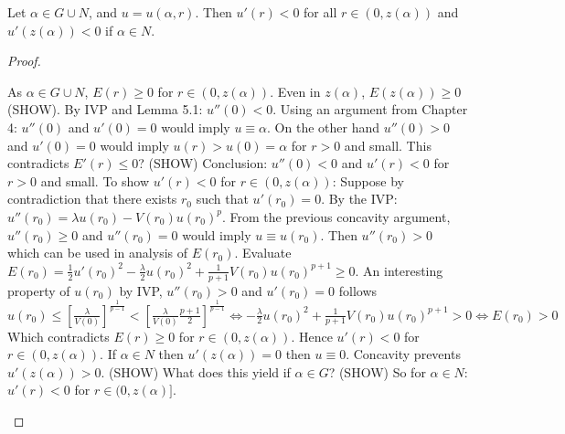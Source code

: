 \newpage
\begin{lemma}
  Let $\alpha\in G\cup N$, and $u=u(\alpha,r)$.
  Then $u'(r)<0$ for all $r\in(0,z(\alpha))$ and $u'(z(\alpha))<0$ if $\alpha\in N$.
%

%
\begin{proof}
  \begin{outline}
    \1 As $\alpha\in G\cup N$, $E(r)\geq0$ for $r\in(0,z(\alpha))$.
    \1 Even in $z(\alpha)$, $E(z(\alpha))\geq0$ (SHOW).
    \1 By IVP and Lemma 5.1: $u''(0)<0$.
    \1 Using an argument from Chapter 4: $u''(0)$ and $u'(0)=0$ would imply $u\equiv\alpha$.
    \1 On the other hand $u''(0)>0$ and $u'(0)=0$ would imply $u(r)>u(0)=\alpha$ for $r>0$ and small.
    \1 This contradicts $E'(r)\leq0$? (SHOW)
    \1 Conclusion: $u''(0)<0$ and $u'(r)<0$ for $r>0$ and small.
    \1 To show $u'(r)<0$ for $r\in(0,z(\alpha))$:
      \2 Suppose by contradiction that there exists $r_0$ such that $u'(r_0)=0$.
      \2 By the IVP: $u''(r_0)=\lambda u(r_0)-V(r_0)u(r_0)^p$.
      \2 From the previous concavity argument, $u''(r_0)\geq0$ and $u''(r_0)=0$ would imply $u\equiv u(r_0)$.
      \2 Then $u''(r_0)>0$ which can be used in analysis of $E(r_0)$.
      \2 Evaluate $E(r_0)=\frac{1}{2}u'(r_0)^2-\frac{\lambda}{2}u(r_0)^2 + \frac{1}{p+1}V(r_0)u(r_0)^{p+1}\geq 0$.
      \2 An interesting property of $u(r_0)$ by IVP, $u''(r_0)>0$ and $u'(r_0)=0$ follows
        \3 $u(r_0)\leq\left[\frac{\lambda}{V(0)}\right]^{\frac{1}{p-1}}<
        \left[\frac{\lambda}{V(0)}\frac{p+1}{2}\right]^{\frac{1}{p-1}} \iff -\frac{\lambda}{2}u(r_0)^2+\frac{1}{p+1}V(r_0)u(r_0)^{p+1}>0 \iff E(r_0)>0$
        \3 Which contradicts $E(r)\geq0$ for $r\in(0,z(\alpha))$.
      \2 Hence $u'(r)<0$ for $r\in(0,z(\alpha))$.
    \1 If $\alpha\in N$ then $u'(z(\alpha))=0$ then $u\equiv0$.
      \2 Concavity prevents $u'(z(\alpha))>0$. (SHOW)
      \2 What does this yield if $\alpha\in G$? (SHOW)
    \1 So for $\alpha\in N$: $u'(r)<0$ for $r\in(0,z(\alpha)]$.
  \end{outline}


\end{proof}
\end{lemma}
